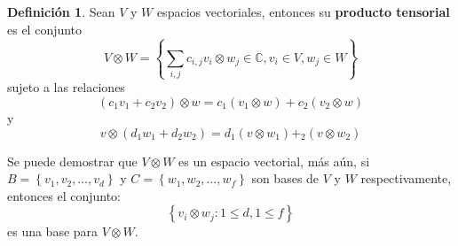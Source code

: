 \documentclass[12pt]{book}
\theoremstyle{definition}
\newtheorem{definition}[theorem]{Definición}
\newcounter{in}
\newcounter{ini}
\begin{document}
\begin{mdframed}
\begin{definition}
  Sean $V$ y $W$ espacios vectoriales, entonces su \textbf{producto
    tensorial} es el conjunto
\begin{equation}
V \otimes W = \left \{ \sum_{i,j} c_{i,j} v_{i} \otimes w_{j} \in \mathbb{C}, v_{i} \in V, w_{j} \in W \right \}
\end{equation}
sujeto a las relaciones
\begin{equation}
(c_1v_1+c_2v_2) \otimes w = c_1(v_1 \otimes w) + c_2(v_2 \otimes w)
\end{equation}
y
\begin{equation}
v \otimes (d_1w_1+d_2w_2)= d_1(v \otimes w_1) + _2(v \otimes w_2)
\end{equation}
\end{definition}
Se puede demostrar que $V \otimes W$ es un espacio vectorial, más aún,
si $B = \left \{ v_1, v_2, \ldots, v_d \right \}$ y
$C = \left \{ w_1, w_2, \ldots, w_f \right \}$ son bases de $V$ y $W$
respectivamente, entonces el conjunto:
\begin{equation}
\left \{ v_i \otimes w_j: 1 \leq d, 1 \leq f \right \}
\end{equation}
es una base para $V \otimes W$.
%

\end{mdframed}
\end{document}
